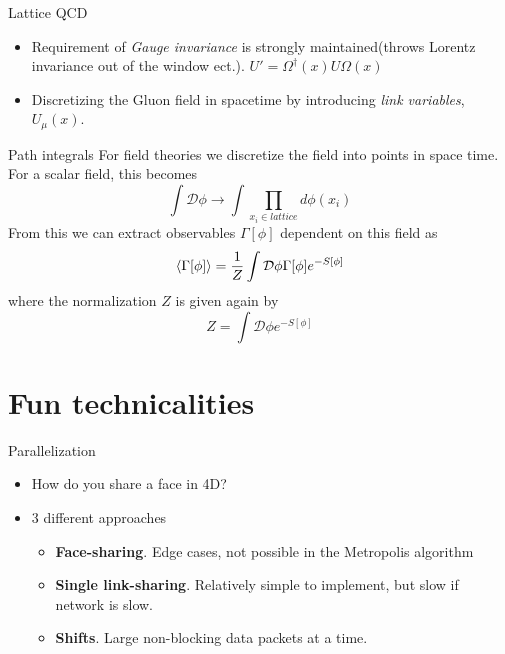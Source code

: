 \documentclass[10pt]{beamer}
\newcommand{\D}{\mathcal{D}}
\begin{document}
\begin{frame}{Lattice QCD}
	\begin{itemize}%
		\item Requirement of \textit{Gauge invariance} is strongly maintained(throws Lorentz invariance out of the window ect.).
		$U' = \Omega^\dagger(x) U \Omega(x)$
		\item Discretizing the Gluon field in spacetime by introducing \textit{link variables}, $U_\mu(x)$.
	\end{itemize}
\end{frame}

\begin{frame}{Path integrals}
	For field theories we discretize the field into points in space time. For a scalar field, this becomes 
	\[
		 \int \D \phi \rightarrow \int \prod_{x_i \in lattice} d\phi(x_i)
	\]
	From this we can extract observables $\Gamma[\phi]$ dependent on this field as
	\[
		\braket{\Gamma[\phi]} = \frac{1}{Z} \int \D \phi \Gamma[\phi] e^{-S[\phi]}
	\]
	where the normalization $Z$ is given again by 
	\[
		Z = \int \D \phi e^{-S[\phi]}
	\]
\end{frame}

\section{Fun technicalities}

\begin{frame}{Parallelization}
	\begin{itemize}%
		\item How do you share a face in 4D?
		\item 3 different approaches
		\begin{itemize}%
			\item \textbf{Face-sharing}. Edge cases, not possible in the Metropolis algorithm
			\item \textbf{Single link-sharing}. Relatively simple to implement, but slow if network is slow.
			\item \textbf{Shifts}. Large non-blocking data packets at a time.
		\end{itemize}
	\end{itemize}
\end{frame}
\end{document}
